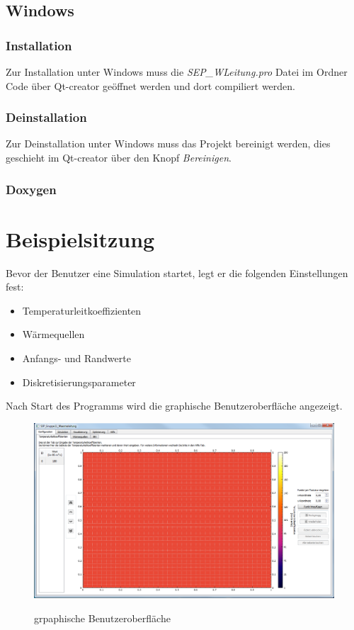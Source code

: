 \subsection{Windows}
\subsubsection{Installation}
Zur Installation unter Windows muss die \emph{SEP\_WLeitung.pro} Datei im Ordner Code über Qt-creator geöffnet werden und dort compiliert werden.
\subsubsection{Deinstallation}
Zur Deinstallation unter Windows muss das Projekt bereinigt werden, dies geschieht im Qt-creator über den Knopf \emph{Bereinigen}.
\subsubsection{Doxygen}

\newpage
\section{Beispielsitzung}

Bevor der Benutzer eine Simulation startet, legt er die folgenden Einstellungen fest:
\begin{itemize}
\item Temperaturleitkoeffizienten
\item Wärmequellen
\item Anfangs- und Randwerte
\item Diskretisierungsparameter
\end{itemize}

Nach Start des Programms wird die graphische Benutzeroberfläche angezeigt.
\begin{figure}[H]
\centering
\includegraphics[scale=.5]{Benutzerdokumentation/StartAnzeige.png}\\
\caption{grpaphische Benutzeroberfläche}
\label{grpaphische Benutzeroberfläche}
\end{figure}

